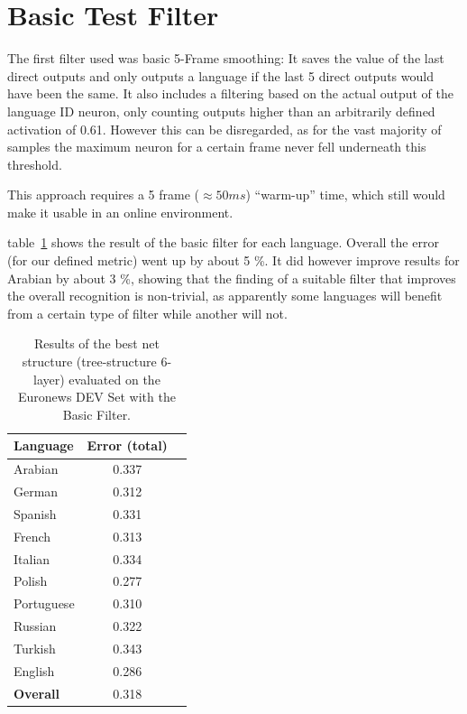 \section{Basic Test Filter}
\label{sec:eval:basic}

The first filter used was basic 5-Frame smoothing: It saves the value of the last direct outputs and only outputs a language if the last 5 direct outputs would have been the same. It also includes a filtering based on the actual output of the language ID neuron, only counting outputs higher than an arbitrarily defined activation of 0.61. However this can be disregarded, as for the vast majority of samples the maximum neuron for a certain frame never fell underneath this threshold.

This approach requires a 5 frame (\(\approx 50 ms\)) ``warm-up'' time, which still would make it usable in an online environment.

table~\ref{tab:basic} shows the result of the basic filter for each language. Overall the error (for our defined metric) went up by about 5 \%. It did however improve results for Arabian by about 3 \%, showing that the finding of a suitable filter that improves the overall recognition is non-trivial, as apparently some languages will benefit from a certain type of filter while another will not. 

\begin{table}[h!]
\centering
\caption{Results of the best net structure (tree-structure 6-layer) evaluated on the Euronews DEV Set with the Basic Filter.}
\label{tab:basic}
\begin{tabular}{| l | c | r | }
	\hline
	\textbf{Language} & \textbf{Error (total)}  \\
	\hline
	Arabian & 0.337  \\
	German & 0.312  \\
	Spanish & 0.331 \\ 
	French & 0.313 \\
	Italian & 0.334  \\
	Polish & 0.277 \\
	Portuguese& 0.310  \\
	Russian&  0.322 \\
	Turkish&  0.343 \\
	English&  0.286 \\
	\hline
	\textbf{Overall} & 0.318 \\
	\hline
\end{tabular}
\end{table}


